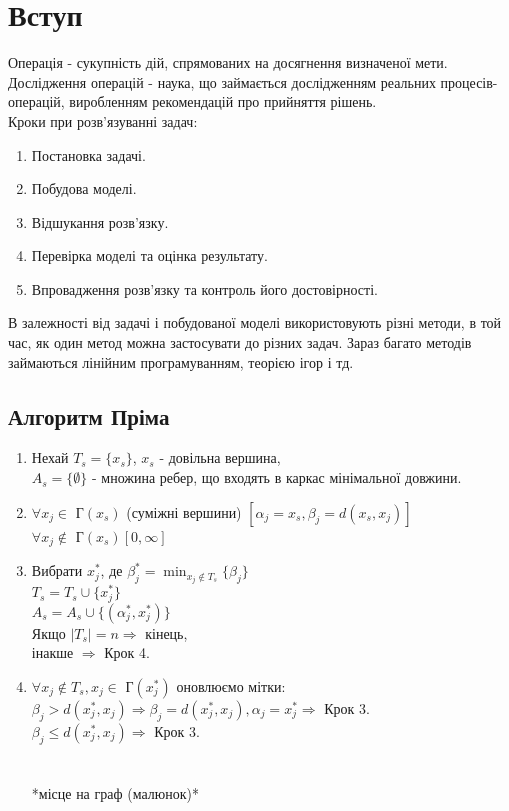\documentclass[12pt]{book}
\begin{document}
\tableofcontents
\chapter{Вступ}
Операція - сукупність дій, спрямованих на досягнення визначеної мети.
Дослідження операцій - наука, що займається дослідженням реальних процесів-операцій, виробленням рекомендацій про прийняття рішень.\\
Кроки при розв'язуванні задач:
\begin{enumerate}
\item Постановка задачі.
\item Побудова моделі.
\item Відшукання розв'язку.
\item Перевірка моделі та оцінка результату.
\item Впровадження розв'язку та контроль його достовірності.
\end{enumerate}
В залежності від задачі і побудованої моделі використовують різні методи, в той час, як один метод можна застосувати до різних задач. Зараз багато методів займаються лінійним програмуванням, теорією ігор і тд.
\section{Алгоритм Пріма}
\begin{enumerate}
\item Нехай $T_s = \{x_s\}$, $x_s$ - довільна вершина,\\
$A_s = \{\emptyset\}$ - множина ребер, що входять в каркас мінімальної довжини.
\item $\forall x_j\in$ Г$(x_s)$ (суміжні вершини) $[\alpha_j=x_s, \beta_j=d(x_s,x_j)]$\\
$\forall x_j\notin$ Г$(x_s) [0,\infty]$
\item Вибрати $x_j^*$, де $\beta_j^*=\displaystyle\min_{x_j{\notin}T_s}\{\beta_j\}$\\
$T_s=T_s\cup\{x_j^*\}$\\
$A_s=A_s\cup\{(\alpha_j^*,x_j^*)\}$\\
Якщо $|T_s|=n\Rightarrow$ кінець,\\
інакше ${\Rightarrow}$ Крок 4.
\item $\forall x_j{\notin}T_s, x_j\in$ Г$(x_j^*)$ оновлюємо мітки:\\
$\beta_j>d(x_j^*,x_j)\Rightarrow \beta_j=d(x_j^*,x_j), \alpha_j=x_j^* \Rightarrow$ Крок 3.\\
$\beta_j{\leq}d(x_j^*,x_j)\Rightarrow$ Крок 3.\\
\\
\\
*місце на граф (малюнок)*
\\
\\
\end{enumerate}
\end{document}
